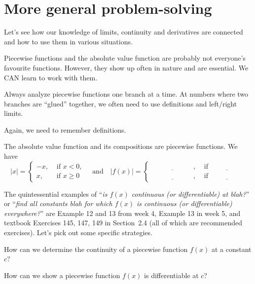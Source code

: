\documentclass[../main.tex]{subfiles}
\begin{document}
 \section{More general problem-solving}
Let's see how our knowledge of limits, continuity and derivatives are connected and how to use them in various situations.

\clearpage

Piecewise functions and the absolute value function are probably not everyone's favourite functions. However, they show up often in nature and are essential. We CAN learn to work with them.

\begin{mdframed}[style=simple-compact]
  Always analyze piecewise functions one branch at a time. At numbers where two branches are ``glued'' together, we often need to use definitions and left/right limits.

  Again, we need to remember definitions.
\end{mdframed}

The absolute value function and its compositions are piecewise functions. We have
\[
  |x| = 
  \begin{cases}
    -x, &\text{ if } x < 0, \\
    x, &\text{ if } x \ge 0
  \end{cases}
  \quad \text{and} \quad 
  |f(x)| = 
  \begin{cases}
    \underline{\hspace{1in}}, &\text{ if } \underline{\hspace{2cm}} \\
    \underline{\hspace{1in}}, &\text{ if } \underline{\hspace{2cm}}
  \end{cases}
\]

The quintessential examples of ``\emph{is \(f(x)\) continuous (or differentiable) at blah?}'' or ``\emph{find all constants blah for which \(f(x)\) is continuous (or differentiable) everywhere?}'' are Example 12 and 13 from week 4, Example 13 in week 5, and textbook Exercises 145, 147, 149 in Section~2.4 (all of which are recommended exercises). Let's pick out some specific strategies.

\faComment{} How can we determine the continuity of a piecewise function \(f(x)\) at a constant \(c\)?


\faComment{} How can we show a piecewise function \(f(x)\) is differentiable at \(c\)?
\end{document}
